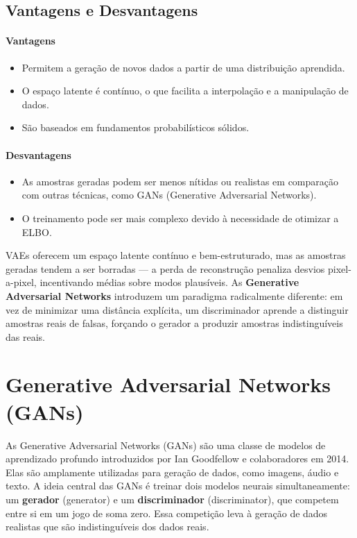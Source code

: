 \documentclass{tufte-handout}
\begin{document}
\subsection{Vantagens e Desvantagens}

\paragraph{Vantagens}
\begin{itemize}
    \item Permitem a geração de novos dados a partir de uma distribuição aprendida.
    \item O espaço latente é contínuo, o que facilita a interpolação e a manipulação de dados.
    \item São baseados em fundamentos probabilísticos sólidos.
\end{itemize}


\paragraph{Desvantagens}
\begin{itemize}
    \item As amostras geradas podem ser menos nítidas ou realistas em comparação com outras técnicas, como GANs (Generative Adversarial Networks).
    \item O treinamento pode ser mais complexo devido à necessidade de otimizar a ELBO.

\end{itemize}

\medskip
\noindent VAEs oferecem um espaço latente contínuo e bem-estruturado, mas as amostras geradas tendem a ser borradas --- a perda de reconstrução penaliza desvios pixel-a-pixel, incentivando médias sobre modos plausíveis. As \textbf{Generative Adversarial Networks} introduzem um paradigma radicalmente diferente: em vez de minimizar uma distância explícita, um discriminador aprende a distinguir amostras reais de falsas, forçando o gerador a produzir amostras indistinguíveis das reais.

\section{Generative Adversarial Networks (GANs)}

As Generative Adversarial Networks (GANs) são uma classe de modelos de aprendizado profundo introduzidos por Ian Goodfellow e colaboradores em 2014. Elas são amplamente utilizadas para geração de dados, como imagens, áudio e texto. A ideia central das GANs é treinar dois modelos neurais simultaneamente: um \textbf{gerador} (generator) e um \textbf{discriminador} (discriminator), que competem entre si em um jogo de soma zero. Essa competição leva à geração de dados realistas que são indistinguíveis dos dados reais.
\end{document}
